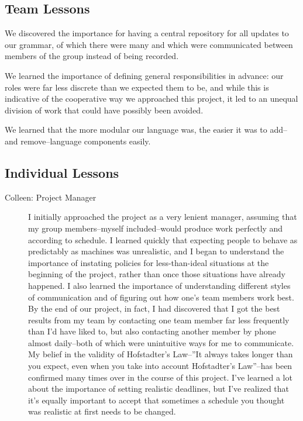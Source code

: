 \subsection{Team Lessons}
We discovered the importance for having a central repository for all
updates to our grammar, of which there were many and which were
communicated between members of the group instead of being recorded.

We learned the importance of defining general responsibilities in
advance: our roles were far less discrete than we expected them to be,
and while this is indicative of the cooperative way we approached this
project, it led to an unequal division of work that could have
possibly been avoided.  

We learned that the more modular our language was, the easier it was
to add--and remove--language components easily. 

\subsection{Individual Lessons}
\begin{description}
\item[Colleen: Project Manager] I initially approached the project as
  a very lenient manager, assuming that my group members--myself
  included--would produce work perfectly and according to schedule. I
  learned quickly that expecting people to behave as predictably as
  machines was unrealistic, and I began to understand the importance
  of instating policies for less-than-ideal situations at the
  beginning of the project, rather than once those situations have
  already happened. I also learned the importance of understanding
  different styles of communication and of figuring out how one’s team
  members work best. By the end of our project, in fact, I had
  discovered that I got the best results from my team by contacting
  one team member far less frequently than I’d have liked to, but also
  contacting another member by phone almost daily--both of which were
  unintuitive ways for me to communicate. My belief in the validity of
  Hofstadter’s Law--”It always takes longer than you expect, even when
  you take into account Hofstadter's Law”--has been confirmed many
  times over in the course of this project. I’ve learned a lot about
  the importance of setting realistic deadlines, but I’ve realized
  that it’s equally important to accept that sometimes a schedule you
  thought was realistic at first needs to be changed.
\end{description}

